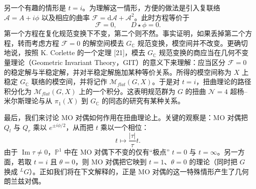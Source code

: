 \documentclass[11pt,a4paper,UTF8]{ctexart}
\begin{document}
另一个有趣的情形是 $t=i$。为理解这一情形，方便的做法是引入复联络 $\mathcal{A}=A+i\phi$ 以及相应的曲率 $\mathcal{F}=\mathrm{d}\mathcal{A}+\mathcal{A}^{2}$。此时方程等价于
\[
    \mathcal{F}=0,\qquad D\star\phi=0.
\]
第一个方程在复化规范变换下不变，第二个则不然。事实证明，如果丢掉第二个方程，转而考虑方程 $\mathcal{F}=0$ 的解空间模去 $G_{\mathbb{C}}$ 规范变换，模空间并不改变。更确切地说，按照 K. Corlette 的一个定理 [21]，模去 $G_{\mathbb{C}}$ 规范变换的商应当在几何不变量理论（Geometric Invariant Theory，GIT）的意义下来理解：应当区分 $\mathcal{F}=0$ 的稳定解与半稳定解，并对半稳定解施加某种等价关系。所得的模空间称为 $X$ 上稳定 $G_{\mathbb{C}}$ 联络的模空间，并将记作 $\mathcal{M}_{flat}(G,X)$。于是对 $t=i$，扭曲理论的路径积分化为 $\mathcal{M}_{flat}(G,X)$ 上的一个积分。这表明规范群为 $G$ 的扭曲 $\mathcal{N}=4$ 超杨–米尔斯理论与从 $\pi_{1}(X)$ 到 $G_{\mathbb{C}}$ 的同态的研究有某种关系。

最后，我们来讨论 MO 对偶如何作用在扭曲理论上。关键的观察是：MO 对偶把 $Q_{l}$ 与 $Q_{r}$ 乘以 $e^{\pm i\phi/2}$，从而把 $t$ 乘以一个相位：
\[
    t\mapsto\frac{|\tau|}{\tau}t.
\]
由于 $\operatorname{Im}\tau\neq 0$，$\mathbb{P}^{1}$ 中在 MO 对偶下不变的仅有“极点” $t=0$ 与 $t=\infty$。另一方面，若取 $t=i$ 且 $\theta=0$，则 MO 对偶把它映到 $t=1$、$\theta=0$ 的理论（同时把 $G$ 换成 ${}^{L}G$）。正如我们将在下文解释的，正是 MO 对偶的这一特殊情形产生了几何朗兰兹对偶。

\end{document}
